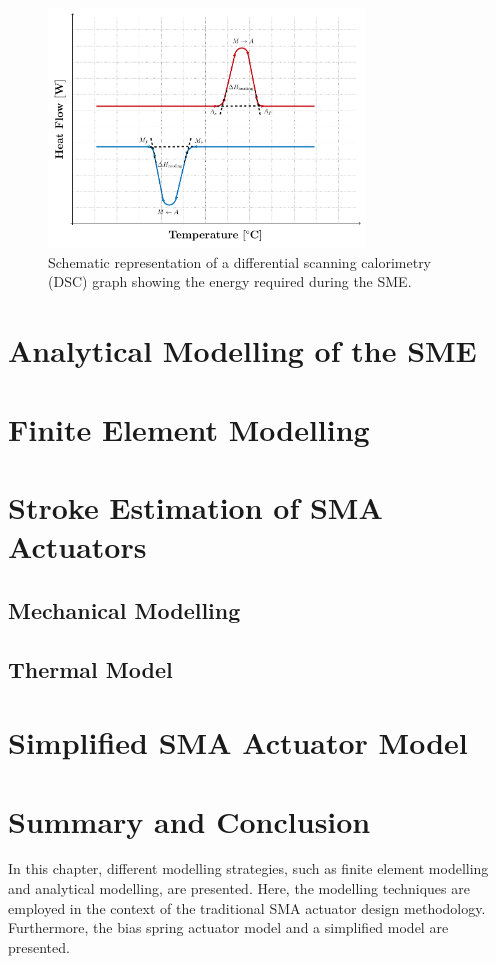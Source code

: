\begin{figure}[hbt]
    \centering
    \includegraphics[width=0.75\textwidth]{images/chap2/dsc-graph.pdf}
    \caption{Schematic representation of a differential scanning calorimetry (DSC) graph showing the energy required during the SME.}
    \label{fig:sma-phase-transformations}
\end{figure}
\section{Analytical Modelling of the SME}
\section{Finite Element Modelling}
\section{Stroke Estimation of SMA Actuators}
\subsection{Mechanical Modelling}
\subsection{Thermal Model}
\section{Simplified SMA Actuator Model}\label{sec:simplified-sma-model}
\section{Summary and Conclusion}
In this chapter, different modelling strategies, such as finite element modelling and analytical modelling, are presented. Here, the modelling techniques are employed in the context of the traditional SMA actuator design methodology. Furthermore, the bias spring actuator model and a simplified model are presented.
